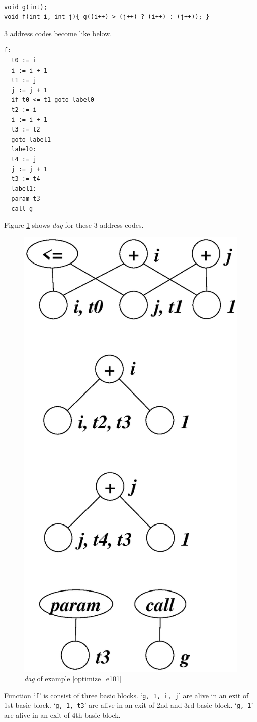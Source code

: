 \begin{Example}
\label{optimize_e101}
\begin{verbatim}

void g(int);
void f(int i, int j){ g((i++) > (j++) ? (i++) : (j++)); }
\end{verbatim}
3 address codes become like below.
\begin{verbatim}
f:
  t0 := i
  i := i + 1
  t1 := j
  j := j + 1
  if t0 <= t1 goto label0
  t2 := i
  i := i + 1
  t3 := t2
  goto label1
  label0:
  t4 := j
  j := j + 1
  t3 := t4
  label1:
  param t3
  call g
\end{verbatim}
Figure \ref{optimize_e102} shows {\em dag} for these 3 address codes.
\begin{figure}[htbp]
\begin{center}
\includegraphics[width=0.556\linewidth,height=1.1\linewidth]{opt044.eps}
\caption{{\em dag} of example \ref{optimize_e101}}
\label{optimize_e102}
\end{center}
\end{figure}
Function `{\tt{f}}' is consist of three basic blocks.
`{\tt{g, 1, i, j}}' are
alive in an exit of 1st basic block.
`{\tt{g, 1, t3}}' are
alive in an exit of 2nd and 3rd basic block.
`{\tt{g, 1}}' are
alive in an exit of 4th basic block.


\end{Example}

